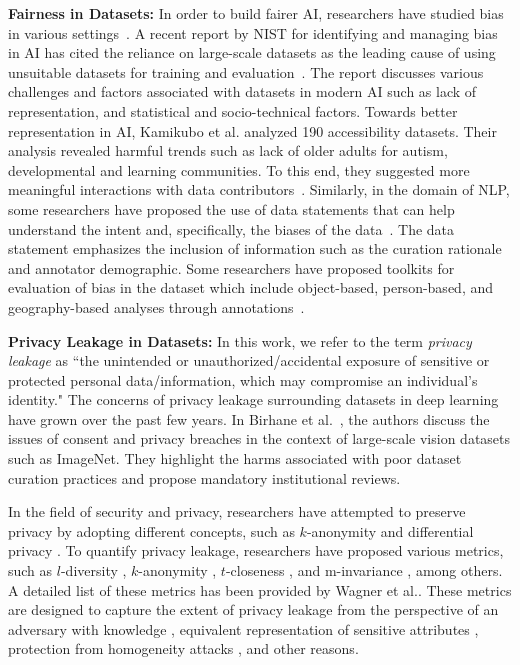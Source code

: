 \documentclass[journal]{IEEEtran}
\begin{document}
\noindent \textbf{Fairness in Datasets:} In order to build fairer AI, researchers have studied bias in various settings~\cite{tommasi2017deeper, yangfei2020towards, de2019does, singh2022anatomizing}. A recent report by NIST for identifying and managing bias in AI has cited the reliance on large-scale datasets as the leading cause of using unsuitable datasets for training and evaluation~\cite{schwartz2022towards}. The report discusses various challenges and factors associated with datasets in modern AI such as lack of representation, and statistical and socio-technical factors. Towards better representation in AI, Kamikubo et al. analyzed 190 accessibility datasets. Their analysis revealed harmful trends such as lack of older adults for autism, developmental and learning communities. To this end, they suggested more meaningful interactions with data contributors~\cite{kamikubo2022data}. Similarly, in the domain of NLP, some researchers have proposed the use of data statements that can help understand the intent and, specifically, the biases of the data~\cite{bender2018data}. The data statement emphasizes the inclusion of information such as the curation rationale and annotator demographic. Some researchers have proposed toolkits for evaluation of bias in the dataset which include object-based, person-based, and geography-based analyses through annotations~\cite{wang2022revise}.

\noindent \textbf{Privacy Leakage in Datasets:}
In this work, we refer to the term \textit{privacy leakage} as ``the unintended or unauthorized/accidental exposure of sensitive or protected personal data/information, which may compromise an individual's identity." The concerns of privacy leakage surrounding datasets in deep learning have grown over the past few years. In Birhane et al.~\cite{birhane2021large}, the authors discuss the issues of consent and privacy breaches in the context of large-scale vision datasets such as ImageNet. They highlight the harms associated with poor dataset curation practices and propose mandatory institutional reviews. 

In the field of security and privacy, researchers have attempted to preserve privacy by adopting different concepts, such as $k$-anonymity \cite{samarati1998protecting} and differential privacy \cite{dwork2008differential}. To quantify privacy leakage, researchers have proposed various metrics, such as $l$-diversity \cite{machanavajjhala2007diversity}, $k$-anonymity \cite{samarati1998protecting}, $t$-closeness \cite{li2006t}, and m-invariance \cite{xiao2007m}, among others. A detailed list of these metrics has been provided by Wagner et al.\cite{wagner2018technical}. These metrics are designed to capture the extent of privacy leakage from the perspective of an adversary with knowledge \cite{li2006t}, equivalent representation of sensitive attributes \cite{machanavajjhala2007diversity}, protection from homogeneity attacks \cite{samarati1998protecting}, and other reasons. 
\end{document}
